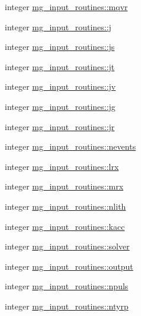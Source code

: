 \begin{DoxyCompactItemize}
\item 
integer \hyperlink{namespacemg__input__routines_a67aa10eca6fcaa9b0bb58f754f9601e4}{mg\+\_\+input\+\_\+routines\+::mqvr}
\item 
integer \hyperlink{namespacemg__input__routines_a292a26be6620117a94388a4961626b88}{mg\+\_\+input\+\_\+routines\+::j}
\item 
integer \hyperlink{namespacemg__input__routines_a2ac0c5af92f879279450a35f8f6f407d}{mg\+\_\+input\+\_\+routines\+::js}
\item 
integer \hyperlink{namespacemg__input__routines_a7f93d05f71f46f0de859cdfc4627cf47}{mg\+\_\+input\+\_\+routines\+::jt}
\item 
integer \hyperlink{namespacemg__input__routines_a9e46f68f8402c238d9dc7938d1c1a333}{mg\+\_\+input\+\_\+routines\+::jv}
\item 
integer \hyperlink{namespacemg__input__routines_aa46cdfb9e05dba796c09d3b429b4b570}{mg\+\_\+input\+\_\+routines\+::jg}
\item 
integer \hyperlink{namespacemg__input__routines_a904a6771d079976761e82cd541845078}{mg\+\_\+input\+\_\+routines\+::jr}
\item 
integer \hyperlink{namespacemg__input__routines_aed1d27aadf7cdaefb4565f0ef803464d}{mg\+\_\+input\+\_\+routines\+::nevents}
\item 
integer \hyperlink{namespacemg__input__routines_aeea0329fda5c5a9795228e5b810aadbf}{mg\+\_\+input\+\_\+routines\+::lrx}
\item 
integer \hyperlink{namespacemg__input__routines_a7d8e6d20b2ea422eec9c2aa426127bb1}{mg\+\_\+input\+\_\+routines\+::mrx}
\item 
integer \hyperlink{namespacemg__input__routines_a2d9631edcca9ca914482e67c19015561}{mg\+\_\+input\+\_\+routines\+::nlith}
\item 
integer \hyperlink{namespacemg__input__routines_ad19c4bbecbed200a723fcb0cba57fb56}{mg\+\_\+input\+\_\+routines\+::kacc}
\item 
integer \hyperlink{namespacemg__input__routines_a7f66390bdc680c1cecf69ec8e1caae9b}{mg\+\_\+input\+\_\+routines\+::solver}
\item 
integer \hyperlink{namespacemg__input__routines_a234f97288d737f186b0b6d42e1a814c6}{mg\+\_\+input\+\_\+routines\+::output}
\item 
integer \hyperlink{namespacemg__input__routines_ad360ffe705c8b4f06540f3b932cfceee}{mg\+\_\+input\+\_\+routines\+::npuls}
\item 
integer \hyperlink{namespacemg__input__routines_a4eb7045180f139626567bfcfd3c8a47b}{mg\+\_\+input\+\_\+routines\+::ntyrp}

\end{DoxyCompactItemize}
